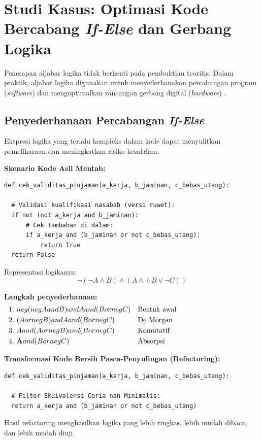 \section{Studi Kasus: Optimasi Kode Bercabang \textit{If-Else} dan Gerbang Logika}

Penerapan aljabar logika tidak berhenti pada pembuktian teoritis. Dalam praktik, aljabar logika digunakan untuk menyederhanakan percabangan program (\textit{software}) dan mengoptimalkan rancangan gerbang digital (\textit{hardware}) \cite{rosen2019}.

\subsection{Penyederhanaan Percabangan \textit{If-Else}}

Ekspresi logika yang terlalu kompleks dalam kode dapat menyulitkan pemeliharaan dan meningkatkan risiko kesalahan.

\textbf{Skenario Kode Asli Mentah:}
\begin{lstlisting}[style=pythonstyle]
def cek_validitas_pinjaman(a_kerja, b_jaminan, c_bebas_utang):
  
  # Validasi kualifikasi nasabah (versi ruwet):
  if not (not a_kerja and b_jaminan):
      # Cek tambahan di dalam:
      if a_kerja and (b_jaminan or not c_bebas_utang):
          return True
  return False
\end{lstlisting}

Representasi logikanya:
\[
\neg(\neg A \wedge B) \wedge (A \wedge (B \vee \neg C))
\]

\textbf{Langkah penyederhanaan:}
\begin{align*}
    1.\ & \neg(\neg A \wedge B) \wedge A \wedge (B \vee \neg C) & \text{\parbox[t]{5.8cm}{Bentuk awal}} \\
    2.\ & (A \vee \neg B) \wedge A \wedge (B \vee \neg C) & \text{\parbox[t]{5.8cm}{De Morgan}} \\
    3.\ & A \wedge (A \vee \neg B) \wedge (B \vee \neg C) & \text{\parbox[t]{5.8cm}{Komutatif}} \\
    4.\ & \mathbf{A} \wedge (B \vee \neg C) & \text{\parbox[t]{5.8cm}{Absorpsi}}
\end{align*}

\textbf{Transformasi Kode Bersih Pasca-Penyulingan (Refactoring):}
\begin{lstlisting}[style=pythonstyle]
def cek_validitas_pinjaman(a_kerja, b_jaminan, c_bebas_utang):
  
  # Filter Ekuivalensi Ceria nan Minimalis:
  return a_kerja and (b_jaminan or not c_bebas_utang)
\end{lstlisting}
Hasil refactoring menghasilkan logika yang lebih ringkas, lebih mudah dibaca, dan lebih mudah diuji.

